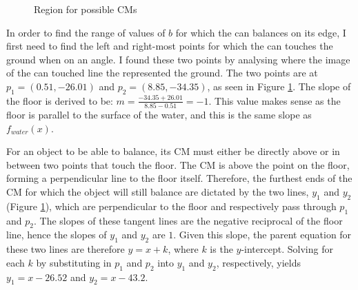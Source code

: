 \documentclass[11pt]{article}
\begin{document}
    \begin{figure}
        \centering
        \caption{Region for possible CMs}
        \label{fig:floor-points}
    \end{figure}

    In order to find the range of values of $b$ for which the can balances on its edge, I first need to find the left and right-most points for which the can touches the ground when on an angle. I found these two points by analysing where the image of the can touched line the represented the ground. The two points are at $p_1 = (0.51, -26.01)$ and $p_2 = (8.85, -34.35)$, as seen in Figure \ref{fig:floor-points}. The slope of the floor is derived to be: $m = \frac{-34.35 + 26.01}{8.85 - 0.51} = -1$. This value makes sense as the floor is parallel to the surface of the water, and this is the same slope as $f_{water}(x)$.

    For an object to be able to balance, its CM must either be directly above or in between two points that touch the floor. The CM is above the point on the floor, forming a perpendicular line to the floor itself. Therefore, the furthest ends of the CM for which the object will still balance are dictated by the two lines, $y_1$ and $y_2$ (Figure \ref{fig:floor-points}), which are perpendicular to the floor and respectively pass through $p_1$ and $p_2$. The slopes of these tangent lines are the negative reciprocal of the floor line, hence the slopes of $y_1$ and $y_2$ are $1$. Given this slope, the parent equation for these two lines are therefore $y = x + k$, where $k$ is the $y$-intercept. Solving for each $k$ by substituting in $p_1$ and $p_2$ into $y_1$ and $y_2$, respectively, yields $y_1 = x - 26.52$ and $y_2 = x - 43.2$.
\end{document}
